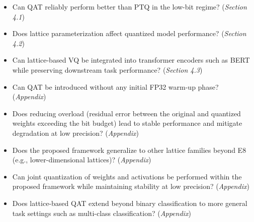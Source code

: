 \documentclass{article}
\theoremstyle{definition}
\theoremstyle{remark}
\begin{document}
\begin{itemize}
    \item Can QAT reliably perform better than PTQ in the low-bit regime? (\textit{Section 4.1})
    
    
    \item Does lattice parameterization affect quantized model performance? (\textit{Section 4.2})
    
    \item Can lattice-based VQ be integrated into transformer encoders such as BERT while preserving downstream task performance? (\textit{Section 4.3})
    
    \item Can QAT be introduced without any initial FP32 warm-up phase? (\textit{Appendix})
    
    \item Does reducing overload (residual error between the original and quantized weights exceeding the bit budget) lead to stable performance and mitigate degradation at low precision? (\textit{Appendix})
    
    \item Does the proposed framework generalize to other lattice families beyond E8 (e.g., lower-dimensional lattices)? (\textit{Appendix})
    
    \item Can joint quantization of weights and activations be performed within the proposed framework while maintaining stability at low precision? (\textit{Appendix})
    
    \item Does lattice-based QAT extend beyond binary classification to more general task settings such as multi-class classification? (\textit{Appendix})
    
\end{itemize}

\end{document}
